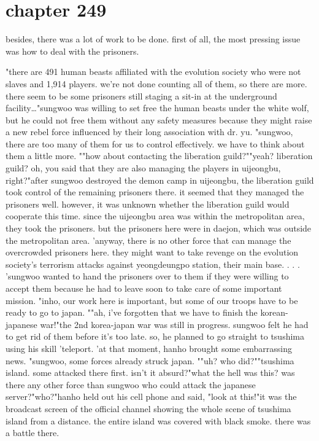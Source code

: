 \section{chapter 249}

besides, there was a lot of work to be done.
 first of all, the most pressing issue was how to deal with the prisoners.





"there are 491 human beasts affiliated with the evolution society who were not slaves and 1,914 players.
 we're not done counting all of them, so there are more.
 there seem to be some prisoners still staging a sit-in at the underground facility…"sungwoo was willing to set free the human beasts under the white wolf, but he could not free them without any safety measures because they might raise a new rebel force influenced by their long association with dr.
 yu.
"sungwoo, there are too many of them for us to control effectively.
 we have to think about them a little more.
""how about contacting the liberation guild?""yeah? liberation guild? oh, you said that they are also managing the players in uijeongbu, right?"after sungwoo destroyed the demon camp in uijeongbu, the liberation guild took control of the remaining prisoners there.
 it seemed that they managed the prisoners well.
however, it was unknown whether the liberation guild would cooperate this time.
 since the uijeongbu area was within the metropolitan area, they took the prisoners.
 but the prisoners here were in daejon, which was outside the metropolitan area.
'anyway, there is no other force that can manage the overcrowded prisoners here.
 they might want to take revenge on the evolution society's terrorism attacks against yeongdeungpo station, their main base.
.
.
.
'sungwoo wanted to hand the prisoners over to them if they were willing to accept them because he had to leave soon to take care of some important mission.
 "inho, our work here is important, but some of our troops have to be ready to go to japan.
""ah, i've forgotten that we have to finish the korean-japanese war!"the 2nd korea-japan war was still in progress.
 sungwoo felt he had to get rid of them before it's too late.
 so, he planned to go straight to tsushima using his skill 'teleport.
'at that moment, hanho brought some embarrassing news.
"sungwoo, some forces already struck japan.
""uh? who did?""tsushima island.
 some attacked there first.
 isn't it absurd?"what the hell was this? was there any other force than sungwoo who could attack the japanese server?"who?"hanho held out his cell phone and said, "look at this!"it was the broadcast screen of the official channel showing the whole scene of tsushima island from a distance.
 the entire island was covered with black smoke.
 there was a battle there.

